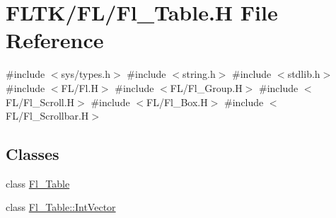 \hypertarget{_fl___table_8_h}{}\section{F\+L\+T\+K/\+F\+L/\+Fl\+\_\+\+Table.H File Reference}
\label{_fl___table_8_h}
{\ttfamily \#include $<$sys/types.\+h$>$}\newline
{\ttfamily \#include $<$string.\+h$>$}\newline
{\ttfamily \#include $<$stdlib.\+h$>$}\newline
{\ttfamily \#include $<$F\+L/\+Fl.\+H$>$}\newline
{\ttfamily \#include $<$F\+L/\+Fl\+\_\+\+Group.\+H$>$}\newline
{\ttfamily \#include $<$F\+L/\+Fl\+\_\+\+Scroll.\+H$>$}\newline
{\ttfamily \#include $<$F\+L/\+Fl\+\_\+\+Box.\+H$>$}\newline
{\ttfamily \#include $<$F\+L/\+Fl\+\_\+\+Scrollbar.\+H$>$}\newline
\subsection*{Classes}
\begin{DoxyCompactItemize}
\item 
class \hyperlink{class_fl___table}{Fl\+\_\+\+Table}
\item 
class \hyperlink{class_fl___table_1_1_int_vector}{Fl\+\_\+\+Table\+::\+Int\+Vector}
\end{DoxyCompactItemize}
